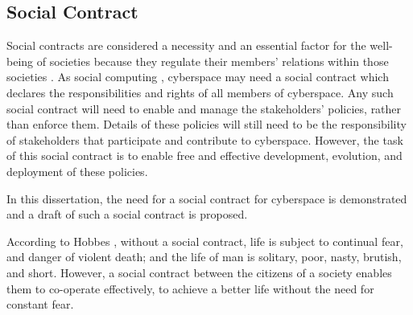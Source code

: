 \subsection{Social Contract}
Social contracts are considered a necessity and an essential factor for the well-being of societies because they regulate their members' relations within those societies \cite{Leviathan}. As social computing \cite{parameswaran2007social}, cyberspace may need a social contract which declares the responsibilities and rights of all members of cyberspace. Any such social contract will need to enable and manage the stakeholders' policies, rather than enforce them. Details of these policies will still need to be the responsibility of stakeholders that participate and contribute to cyberspace. However, the task of this social contract is to enable free and effective development, evolution, and deployment of these policies. 

In this dissertation, the need for a social contract for cyberspace is demonstrated and a draft of such a social contract is proposed. 

According to Hobbes \cite{Leviathan}, without a social contract, life is subject to continual fear, and danger of violent death; and the life of man is solitary, poor, nasty, brutish, and short. 
However, a social contract between the citizens of a society enables them to co-operate effectively, to achieve a better life without the need for constant fear.

